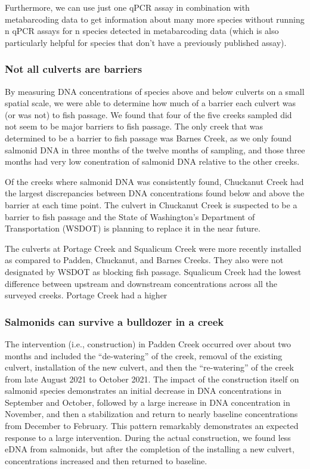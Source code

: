 \documentclass[
]{article}
\begin{document}
Furthermore, we can use just one qPCR assay in combination with
metabarcoding data to get information about many more species without
running n qPCR assays for n species detected in metabarcoding data
(which is also particularly helpful for species that don't have a
previously published assay).

\hypertarget{not-all-culverts-are-barriers}{%
\subsubsection{Not all culverts are
barriers}\label{not-all-culverts-are-barriers}}

By measuring DNA concentrations of species above and below culverts on a
small spatial scale, we were able to determine how much of a barrier
each culvert was (or was not) to fish passage. We found that four of the
five creeks sampled did not seem to be major barriers to fish passage.
The only creek that was determined to be a barrier to fish passage was
Barnes Creek, as we only found salmonid DNA in three months of the
twelve months of sampling, and those three months had very low
conentration of salmonid DNA relative to the other creeks.

Of the creeks where salmonid DNA was consistently found, Chuckanut Creek
had the largest discrepancies between DNA concentrations found below and
above the barrier at each time point. The culvert in Chuckanut Creek is
suspected to be a barrier to fish passage and the State of Washington's
Department of Transportation (WSDOT) is planning to replace it in the
near future.

The culverts at Portage Creek and Squalicum Creek were more recently
installed as compared to Padden, Chuckanut, and Barnes Creeks. They also
were not designated by WSDOT as blocking fish passage. Squalicum Creek
had the lowest difference between upstream and downstream concentrations
across all the surveyed creeks. Portage Creek had a higher

\hypertarget{salmonids-can-survive-a-bulldozer-in-a-creek}{%
\subsubsection{Salmonids can survive a bulldozer in a
creek}\label{salmonids-can-survive-a-bulldozer-in-a-creek}}

The intervention (i.e., construction) in Padden Creek occurred over
about two months and included the ``de-watering'' of the creek, removal
of the existing culvert, installation of the new culvert, and then the
``re-watering'' of the creek from late August 2021 to October 2021. The
impact of the construction itself on salmonid species demonstrates an
initial decrease in DNA concentrations in September and October,
followed by a large increase in DNA concentration in November, and then
a stabilization and return to nearly baseline concentrations from
December to February. This pattern remarkably demonstrates an expected
response to a large intervention. During the actual construction, we
found less eDNA from salmonids, but after the completion of the
installing a new culvert, concentrations increased and then returned to
baseline.
\end{document}
